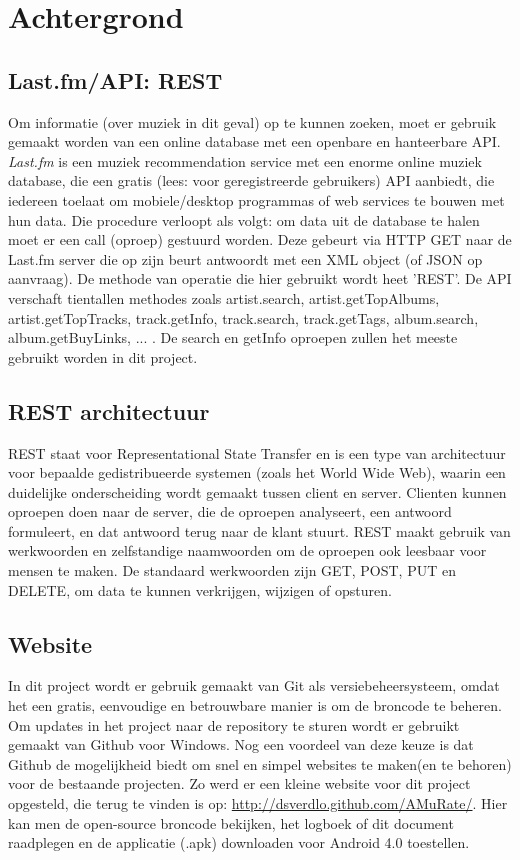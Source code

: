 \documentclass[11pt,a4paper]{article}
\begin{document}
\section{Achtergrond}
	\subsection{Last.fm/API: REST}
Om informatie (over muziek in dit geval) op te kunnen zoeken, moet er gebruik gemaakt worden van een online database met een openbare en hanteerbare API. \textit{Last.fm} is een muziek recommendation service met een enorme online muziek database, die  een gratis (lees: voor geregistreerde gebruikers) API aanbiedt, die iedereen toelaat om mobiele/desktop programmas of web services te bouwen met hun data.
\newline
Die procedure verloopt als volgt: om data uit de database te halen moet er een call (oproep) gestuurd worden. Deze gebeurt via HTTP GET naar de Last.fm server die op zijn beurt antwoordt met een XML object (of JSON op aanvraag). De methode van operatie die hier gebruikt wordt heet 'REST'. 
\newline
De API verschaft tientallen methodes zoals artist.search, artist.getTopAlbums, artist.getTopTracks, track.getInfo, track.search, track.getTags, album.search, album.getBuyLinks, ... . De search en getInfo oproepen zullen het meeste gebruikt worden in dit project. 
	\subsection{REST architectuur}
	REST staat voor Representational State Transfer en is een type van architectuur voor bepaalde gedistribueerde systemen (zoals het World Wide Web), waarin een duidelijke onderscheiding wordt gemaakt tussen client en server. Clienten kunnen oproepen doen naar de server, die de oproepen analyseert, een antwoord formuleert, en dat antwoord terug naar de klant stuurt. REST maakt gebruik van werkwoorden en zelfstandige naamwoorden om de oproepen ook leesbaar voor mensen te maken. De standaard werkwoorden zijn GET, POST, PUT en DELETE, om data te kunnen verkrijgen, wijzigen of opsturen.
	
	\subsection{Website}
		In dit project wordt er gebruik gemaakt van Git als versiebeheersysteem, omdat het een gratis, eenvoudige en betrouwbare manier is om de broncode te beheren. Om updates in het project naar de repository te sturen wordt er gebruikt gemaakt van Github voor Windows. Nog een voordeel van deze keuze is dat Github de mogelijkheid biedt om snel en simpel websites te maken(en te behoren) voor de bestaande projecten. Zo werd er een kleine website voor dit project opgesteld, die terug te vinden is op: \url{http://dsverdlo.github.com/AMuRate/}. Hier kan men de open-source broncode bekijken, het logboek of dit document raadplegen en de applicatie (.apk) downloaden voor Android 4.0 toestellen.
		
\end{document}
